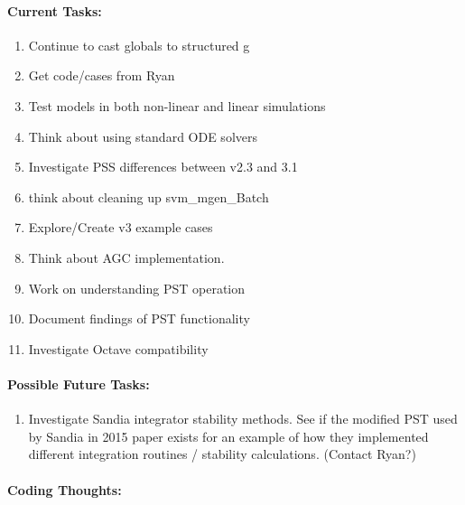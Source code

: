 \documentclass[12pt]{article}
\begin{document}
\begin{multicols}{2}
	
\paragraph{Current Tasks:}
	\begin{enumerate}
		\itemsep 0em 
		\item Continue to cast globals to structured g
		\item Get code/cases from Ryan
		\item Test models in both non-linear and linear simulations
		\item Think about using standard ODE solvers
		\item Investigate PSS differences between v2.3 and 3.1
		\item think about cleaning up svm\_mgen\_Batch
		\item Explore/Create v3 example cases
		\item Think about AGC implementation.
		\item Work on understanding PST operation
		\item Document findings of PST functionality
		\item Investigate Octave compatibility
\end{enumerate}

\vfill\null
\columnbreak

\paragraph{Possible Future Tasks:} %
	\begin{enumerate}
		\item Investigate Sandia integrator stability methods.	
		See if the modified PST used by Sandia in 2015 paper exists for an example of how they implemented different integration routines / stability calculations.	(Contact Ryan?)
	\end{enumerate}


\paragraph{Coding Thoughts:} 
	\begin{enumerate}


\end{enumerate}
\end{multicols}
\end{document}
